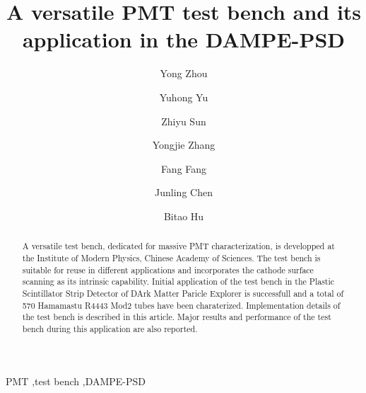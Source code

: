 \documentclass[review, times]{elsarticle}
\begin{document}
\begin{frontmatter}

\title{A versatile PMT test bench and its application in the DAMPE-PSD}

\author[imp,lzu,ucas]{Yong Zhou}

\author[imp]{Yuhong Yu}

\author[imp]{Zhiyu Sun}

\author[imp]{Yongjie Zhang}
\author[imp]{Fang Fang}
\author[imp]{Junling Chen}

\author[lzu]{Bitao Hu}

\address[imp]{Institute of Modern Physicas, Chinese Academy of Sciences,  509 Nanchang Road,  Lanzhou,  730000,  P.R.China}
\address[lzu]{School of Nuclear Science and Technology,  Lanzhou University,  222 South Tianshui Road,  Lanzhou,  730000,  P.R.China}
\address[ucas]{Graduate University of the Chinese Academy of Sciences,  19A Yuquan Road,  Beijing,  100049,  P.R.China}

\begin{abstract}

A versatile test bench, dedicated for massive PMT characterization, is developped at the Institute of Modern Physics, Chinese Academy of Sciences.
The test bench is suitable for reuse in different applications and incorporates the cathode surface scanning as its intrinsic capability.
Initial application of the test bench in the Plastic Scintillator Strip Detector of DArk Matter Paricle Explorer is successfull and a total of 570 Hamamastu R4443 Mod2 tubes have been charaterized.
Implementation details of the test bench is described in this article.
Major results and performance of the test bench during this application are also reported. 
\end{abstract}

\begin{keyword}
PMT
\sep test bench
\sep DAMPE-PSD



\end{keyword}

\end{frontmatter}
\linenumbers
\end{document}
